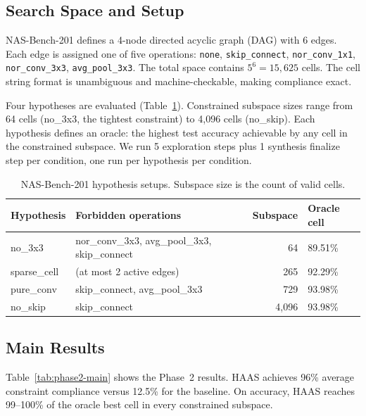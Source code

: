 \documentclass[10pt]{article}
\newcommand{\haas}{\textsc{HAAS}}
\newcommand{\nasbench}{NAS-Bench-201}
\begin{document}
\subsection{Search Space and Setup}
\label{sec:phase2-setup}

\nasbench{} defines a 4-node directed acyclic graph (DAG) with 6 edges. Each
edge is assigned one of five operations: \texttt{none}, \texttt{skip\_connect},
\texttt{nor\_conv\_1x1}, \texttt{nor\_conv\_3x3}, \texttt{avg\_pool\_3x3}.
The total space contains $5^6 = 15{,}625$ cells. The cell string format
is unambiguous and machine-checkable, making compliance exact.

Four hypotheses are evaluated (Table~\ref{tab:phase2-setup}). Constrained
subspace sizes range from 64 cells (no\_3x3, the tightest constraint) to
4,096 cells (no\_skip). Each hypothesis defines an oracle: the highest test
accuracy achievable by any cell in the constrained subspace. We run 5
exploration steps plus 1 synthesis finalize step per condition, one run per
hypothesis per condition.

\begin{table}[t]
\caption{\nasbench{} hypothesis setups. Subspace size is the count of valid cells.}
\label{tab:phase2-setup}
\begin{center}
\small
\begin{tabular}{llrp{4cm}}
\toprule
\textbf{Hypothesis} & \textbf{Forbidden operations} & \textbf{Subspace} & \textbf{Oracle cell} \\
\midrule
no\_3x3      & nor\_conv\_3x3, avg\_pool\_3x3, skip\_connect & 64       & 89.51\% \\
sparse\_cell & (at most 2 active edges)                      & 265      & 92.29\% \\
pure\_conv   & skip\_connect, avg\_pool\_3x3                 & 729      & 93.98\% \\
no\_skip     & skip\_connect                                 & 4{,}096  & 93.98\% \\
\bottomrule
\end{tabular}
\end{center}
\end{table}

\subsection{Main Results}
\label{sec:phase2-results}

Table~\ref{tab:phase2-main} shows the Phase~2 results. \haas{} achieves
96\% average constraint compliance versus 12.5\% for the baseline. On accuracy,
\haas{} reaches 99--100\% of the oracle best cell in every constrained subspace.
\end{document}
